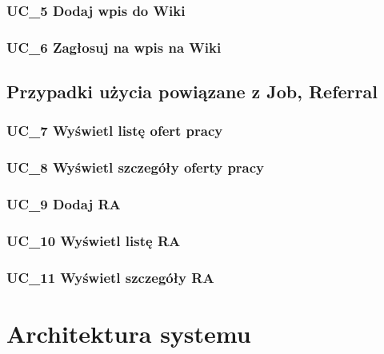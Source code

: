 \documentclass[oneside]{scrreprt}
\begin{document}
\subsection{UC\_5 Dodaj wpis do Wiki}
\subsection{UC\_6 Zagłosuj na wpis na Wiki}

\section{Przypadki użycia powiązane z Job, Referral}
\subsection{UC\_7 Wyświetl listę ofert pracy}
\subsection{UC\_8 Wyświetl szczegóły oferty pracy}
\subsection{UC\_9 Dodaj RA}
\subsection{UC\_10 Wyświetl listę RA}
\subsection{UC\_11 Wyświetl szczegóły RA}

\chapter{Architektura systemu}
\end{document}
